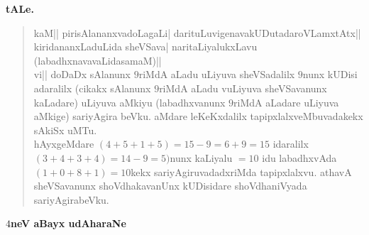 \begin{center}
{\large\bf tALe.}
\end{center}

\begin{verse}
kaM|| pirisAlananxvadoLagaLi| darituLuvigenavakUDutadaroVLamxtAtx|| kiridananxLaduLida sheVSava| naritaLiyalukxLavu (labadhxnavavaLidasamaM)||\\

vi|| doDaDx sAlanunx $9$riMdA aLadu uLiyuva sheVSadalilx $9$nunx kUDisi adaralilx (cikakx sAlanunx $9$riMdA aLadu vuLiyuva sheVSavanunx kaLadare) uLiyuva aMkiyu (labadhxvanunx $9$riMdA aLadare uLiyuva aMkige) sariyAgira beVku. aMdare leKeKxdalilx tapipxlalxveMbuvadakekx sAkiSx uMTu.\\
hAyxgeMdare $(4+5+1+5)= 15-9=6+9=15$ idaralilx $(3+4+3+4)=14-9=5)$nunx kaLiyalu $=10$ idu labadhxvAda $(1+0+8+1)=10$kekx sariyAgiruvadadxriMda tapipxlalxvu. athavA sheVSavanunx shoVdhakavanUnx kUDisidare shoVdhaniVyada sariyAgirabeVku.\\
\end{verse}

\begin{center}
{\bf\large {\boldmath$4$}neV aBayx udAharaNe}
\end{center}


